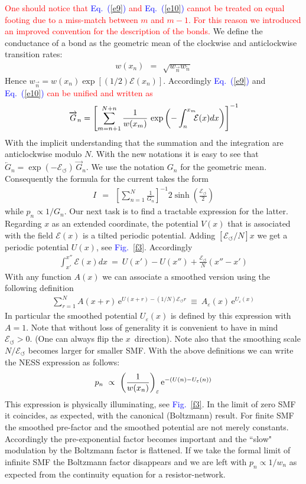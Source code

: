 \documentclass[aps,pre,floats,floatfix,twocolumn]{revtex4}
\newcommand{\eexp}{\mbox{e}^}
\newcommand{\mylabel}[1]{\label{#1}}
\newcommand{\beq}{\begin{eqnarray}}
\newcommand{\eeq}{\end{eqnarray}}
\newcommand{\be}[1]{\begin{eqnarray}\ifthenelse{#1=-1}
{\nonumber}{\ifthenelse{#1=0}{}{\mylabel{e#1}}}}
\newcommand{\Eq}[1]{\textcolor{blue}{Eq.\!\!~(\ref{#1})}}
\newcommand{\Fig}[1]{\textcolor{blue}{Fig.}\!\!~\ref{#1}}
\newcommand{\rmrk}[1]{\textcolor{red}{#1}}
\begin{document}
\rmrk{One should notice that \Eq{e9} and \Eq{e10} cannot 
be treated on equal footing due to a miss-match 
between $m$ and $m{-}1$. For this reason 
we introduced an improved convention for the description 
of the bonds.}  
We define the conductance of a bond as the geometric mean 
of the clockwise and anticlockwise transition rates: 
%
\beq  
w(x_n) \ \ = \ \ \sqrt{ w_{\overrightarrow{n}} w_{\overleftarrow{n}} }
\eeq
%
Hence $w_{\overrightarrow{n}} = w(x_n) \exp[(1/2)\mathcal{E}(x_n)]$.
Accordingly  \Eq{e9} and \Eq{e10} \rmrk{can be unified and written as} 
%
%
\be{13}
\overrightarrow{G}_n = \left[ \sum_{m=n+1}^{N+n} \frac{1}{w(x_m)} 
\,\exp\left(-\int_{n}^{x_m} \!\!\!\mathcal{E}(x)dx \right) \right]^{-1} 
\eeq
%
With the implicit understanding that the summation and the integration 
are anticlockwise modulo $N$. With the new notations it is easy to see 
that ${\overleftarrow{G}_n = \exp(-\mathcal{E}_{\circlearrowleft}) \, \overrightarrow{G}_n}$.
We use the notation $G_n$ for the geometric mean. Consequently 
the formula for the current takes the form 
%
\beq
I \ \ = \ \ \left[\sum_{n=1}^N \frac{1}{G_n}\right]^{-1} 2\sinh\left(\frac{\mathcal{E}_{\circlearrowleft}}{2}\right)
\eeq 
%
while $p_n\propto 1/G_n$. Our next task is to find a tractable
expression for the latter. Regarding $x$ as an extended coordinate, 
the potential $V(x)$ that is associated with the field $\mathcal{E}(x)$ 
is a tilted periodic potential. Adding $[\mathcal{E}_{\circlearrowleft}/N] x$
we get a periodic potential $U(x)$, see \Fig{f3}. Accordingly 
%
\beq
\int_{x'}^{x''} \!\!\!\mathcal{E}(x)dx \ = \ U(x'){-}U(x'') + \frac{\mathcal{E}_{\circlearrowleft}}{N}(x''{-}x')
\eeq  
%
With any function $A(x)$ we can associate a smoothed version 
using the following definition  
%
\beq
\sum_{r=1}^N A(x{+}r) \, \eexp{U(x{+}r)- (1/N)\mathcal{E}_{\circlearrowleft}r} \ \equiv \ A_{\varepsilon}(x) \, \eexp{U_{\varepsilon}(x)} 
\eeq
%
In particular the smoothed potential $U_{\varepsilon}(x)$ is defined by this expression with ${A=1}$. 
Note that without loss of generality it is convenient to have 
in mind ${\mathcal{E}_{\circlearrowleft}>0}$. (One can always flip the $x$~direction).  
Note also that the smoothing scale $N/\mathcal{E}_{\circlearrowleft}$ becomes larger for smaller SMF.
With the above definitions we can write the NESS expression as follows:
%
\be{17}
p_n \ \propto \ \left( \frac{1}{w(x_n)} \right)_{\varepsilon} \eexp{-(U(n)-U_{\varepsilon}(n))}
\eeq
%
This expression is physically illuminating, see \Fig{f3}. 
In the limit of zero SMF it coincides, as expected, 
with the canonical (Boltzmann) result. 
For finite SMF the smoothed pre-factor and the smoothed potential
are not merely constants. Accordingly the pre-exponential factor
becomes important and the ``slow" modulation by the Boltzmann factor 
is flattened. If we take the formal limit of infinite SMF 
the Boltzmann factor disappears and we are left with ${p_n \propto 1/w_n}$    
as expected from the continuity equation for a resistor-network. 
\end{document}
